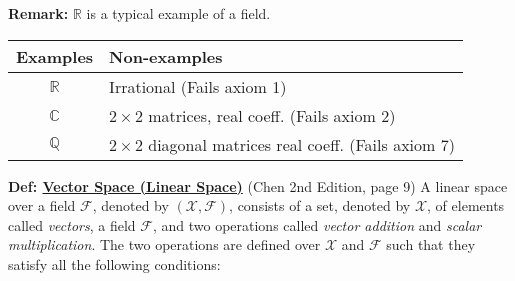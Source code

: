 \documentclass[letterpaper]{article}
\newcommand{\real}{\mathbb R}  %
\newcommand{\cp}{\mathbb C}    %
\begin{document}
\noindent \textbf{Remark:} $\real$ is a typical example of a field.

\begin{center}
\begin{tabular}{|c|l|}
\hline
Examples & Non-examples \\ \hline
$\real$ & Irrational (Fails axiom 1) \\ \hline
$\cp$ & $2\times2$ matrices, real coeff. (Fails axiom 2) \\ \hline
$\mathbb{Q}$ & $2\times2$ diagonal matrices real coeff. (Fails axiom 7) \\ \hline
\end{tabular}
\end{center}

\noindent \textbf{Def: \underline{Vector Space (Linear Space)}} (Chen 2nd Edition, page 9) A linear space over a field $\mathcal{F}$, denoted by $\left(\mathcal{X},\mathcal{F}\right)$, consists of a set, denoted by $\mathcal{X}$, of elements called \textit{vectors}, a field $\mathcal{F}$, and two operations called \textit{vector addition} and \textit{scalar multiplication}. The two operations are defined over $\mathcal{X}$ and $\mathcal{F}$ such that they satisfy all the following conditions:
\end{document}
